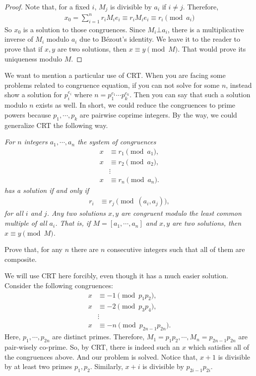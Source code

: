 \documentclass{subfile}
\begin{document}
		\begin{proof}
			Note that, for a fixed $i$, $M_j$ is divisible by $a_i$ if $i\neq j$. Therefore,
			\begin{align*}
			x_0 = \sum_{i=1}^{n} r_i M_ie_i \equiv r_iM_ie_i\equiv r_i\pmod{a_i}
			\end{align*}
			So $x_0$ is a solution to those congruences. Since $M_i\bot a_i$, there is a multiplicative inverse of $M_i$ modulo $a_i$ due to B\'{e}zout's identity. We leave it to the reader to prove that if $x,y$ are two solutions, then $x\equiv y\pmod M$. That would prove its uniqueness modulo $M$.
		\end{proof}
	We want to mention a particular use of CRT. When you are facing some problems related to congruence equation, if you can not solve for some $n$, instead show a solution for $p_i^{e_i}$ where $n=p_1^{e_1}\cdots p_k^{e_k}$. Then you can say that such a solution modulo $n$ exists as well. In short, we could reduce the congruences to prime powers because $p_1,\cdots,p_k$ are pairwise coprime integers. By the way, we could generalize CRT the following way.
		\begin{theorem}\slshape
			For $n$ integers $a_1,\cdots,a_n$ the system of congruences
			\begin{align*}
				x & \equiv r_1\pmod{a_1},\\
				x & \equiv r_2\pmod{a_2},\\
				&\vdots\\
				x & \equiv r_n\pmod{a_n}.
			\end{align*}
			has a solution if and only if
			\begin{align*}
				r_i & \equiv r_j\pmod{(a_i,a_j)},
			\end{align*}
			for all $i$ and $j$. Any two solutions $x,y$ are congruent modulo the least common multiple of all $a_i$. That is, if $M=[a_1,\cdots,a_n]$ and $x,y$ are two solutions, then $x\equiv y\pmod M$.
		\end{theorem}
	
		\begin{problem}
			Prove that, for any $n$ there are $n$ consecutive integers such that all of them are composite.
		\end{problem}
		
		\begin{solution}
			We will use CRT here forcibly, even though it has a much easier solution. Consider the following congruences:
				\begin{align*}
					x & \equiv -1\pmod{p_1p_2},\\
					x & \equiv -2\pmod{p_3p_4},\\
					  & \vdots \\
					x & \equiv -n\pmod{p_{2n-1}p_{2n}}.
				\end{align*}
			Here, $p_1,\cdots,p_{2n}$ are distinct primes. Therefore, $M_1=p_1p_2,\cdots,M_n=p_{2n-1}p_{2n}$ are pair-wisely co-prime. So, by CRT, there is indeed such an $x$ which satisfies all of the congruences above. And our problem is solved. Notice that, $x+1$ is divisible by at least two primes $p_1,p_2$. Similarly, $x+i$ is divisible by $p_{2i-1}p_{2i}$.
		\end{solution}
	
\end{document}
